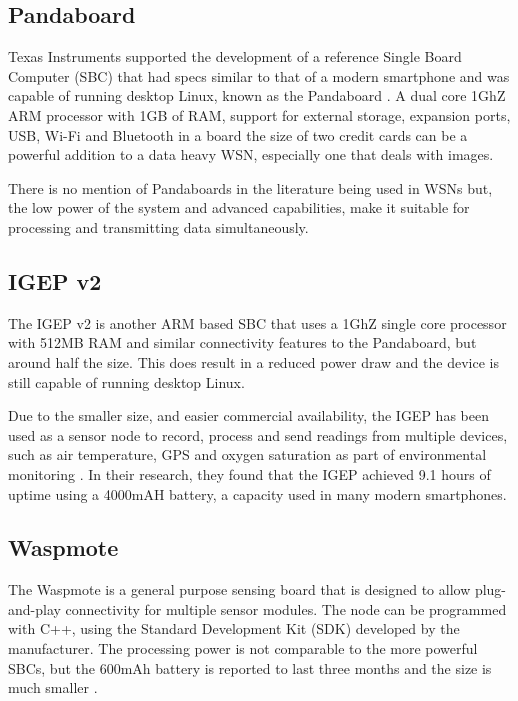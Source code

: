 \subsection{Pandaboard}

Texas Instruments supported the development of a reference Single Board Computer (SBC) that had specs similar to that of a modern smartphone and was capable of running desktop Linux, known as the Pandaboard \cite{instruments2012pandaboard}. A dual core 1GhZ ARM processor with 1GB of RAM, support for external storage, expansion ports, USB, Wi-Fi and Bluetooth in a board the size of two credit cards can be a powerful addition to a data heavy WSN, especially one that deals with images.

There is no mention of Pandaboards in the literature being used in WSNs but, the low power of the system and advanced capabilities, make it suitable for processing and transmitting data simultaneously. 
	
\subsection{IGEP v2}

The IGEP v2 is another ARM based SBC that uses a 1GhZ single core processor with 512MB RAM and similar connectivity features to the Pandaboard, but around half the size. This does result in a reduced power draw and the device is still capable of running desktop Linux.

Due to the smaller size, and easier commercial availability, the IGEP has been used as a sensor node to record, process and send readings from multiple devices, such as air temperature, GPS and oxygen saturation as part of environmental monitoring \cite{Resch}. In their research, they found that the IGEP achieved 9.1 hours of uptime using a 4000mAH battery, a capacity used in many modern smartphones.

\subsection{Waspmote}
The Waspmote is a general purpose sensing board that is designed to allow plug-and-play connectivity for multiple sensor modules. The node can be programmed with C++, using the Standard Development Kit (SDK) developed by the manufacturer. The processing power is not comparable to the more powerful SBCs, but the 600mAh battery is reported to last three months and the size is much smaller \cite{waspmote}.

